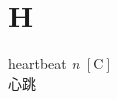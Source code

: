 \section{H}

\item[] {
    \lettrine{heartbeat}{}  
    \textit{n} 
    $\mathrm{[C]}$ 
    \\
    心跳

} 
